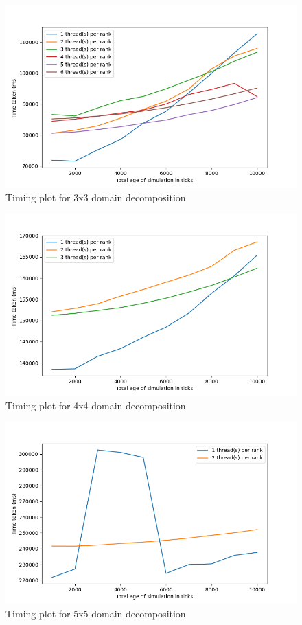 \documentclass[12pt]{article}
\begin{document}
\begin{figure}[hp]
    \includegraphics[scale=0.65, center]{figures/time_hybrid_r9_plot.png}
    \caption{Timing plot for 3x3 domain decomposition}
    \label{fig:time_r9}
\end{figure}

\begin{figure}[hp]
    \includegraphics[scale=0.65, center]{figures/time_hybrid_r16_plot.png}
    \caption{Timing plot for 4x4 domain decomposition}
    \label{fig:time_r16}
\end{figure}

\begin{figure}[hp]
    \includegraphics[scale=0.65, center]{figures/time_hybrid_r25_plot.png}
    \caption{Timing plot for 5x5 domain decomposition}
    \label{fig:time_r25}
\end{figure}
\end{document}
